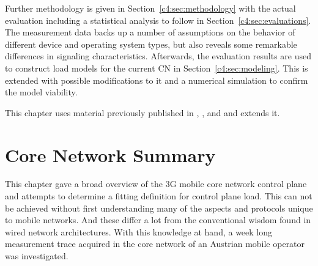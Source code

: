 Further methodology is given in Section~\ref{c4:sec:methodology} with the actual evaluation including a statistical analysis to follow in Section~\ref{c4:sec:evaluations}. The measurement data backs up a number of assumptions on the behavior of different device and operating system types, but also reveals some remarkable differences in signaling characteristics. Afterwards, the evaluation results are used to construct load models for the current \gls{CN} in Section~\ref{c4:sec:modeling}. This is extended with possible modifications to it and a numerical simulation to confirm the model viability.

This chapter uses material previously published in \cite{metzger2012research}, \cite{metzger2014jcnc}, and \cite{metzger2014lossmodel} and extends it.
























\section{Core Network Summary}
\label{c4:sec:conclusion}

This chapter gave a broad overview of the \gls{3G} mobile core network control plane and attempts to determine a fitting definition for control plane load. This can not be achieved without first understanding many of the aspects and protocols unique to mobile networks. And these differ a lot from the conventional wisdom found in wired network architectures. With this knowledge at hand, a week long measurement trace acquired in the core network of an Austrian mobile operator was investigated. 

